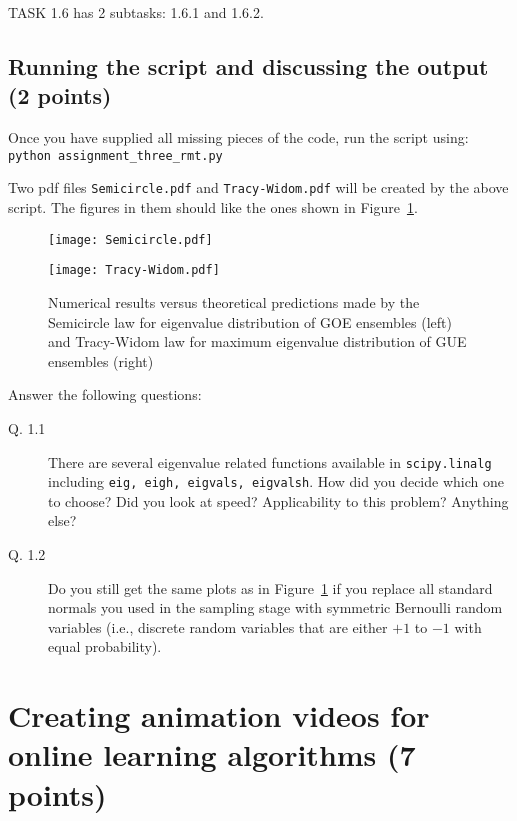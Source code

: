 \documentclass{article}
\begin{document}
TASK 1.6 has 2 subtasks: 1.6.1 and 1.6.2.

\subsection{Running the script and discussing the output (2 points)}

Once you have supplied all missing pieces of the code, run the script using:\\
{\tt python assignment\_three\_rmt.py}

Two pdf files \verb#Semicircle.pdf# and \verb#Tracy-Widom.pdf# will be created by the above script. The figures in them should like the ones
shown in Figure~\ref{rmt}.

\begin{figure}
\begin{minipage}{.4\textwidth}
\texttt{[image: Semicircle.pdf]}
\end{minipage}
\hspace{.1\textwidth}
\begin{minipage}{.4\textwidth}
\texttt{[image: Tracy-Widom.pdf]}
\end{minipage}
\caption{Numerical results versus theoretical predictions made by the Semicircle law for eigenvalue distribution of GOE ensembles (left) and Tracy-Widom law for
maximum eigenvalue distribution of GUE ensembles (right)}
\label{rmt}
\end{figure}

Answer the following questions:
\begin{description}
\item[Q. 1.1]
There are several eigenvalue related functions available in \verb#scipy.linalg# including {\tt eig, eigh, eigvals, eigvalsh}. How did you decide which one to choose?
Did you look at speed? Applicability to this problem? Anything else?
\item[Q. 1.2]
Do you still get the same plots as in Figure~\ref{rmt} if you replace all standard normals you used in the sampling stage with symmetric Bernoulli random variables (i.e.,
discrete random variables that are either $+1$ to $-1$ with equal probability).

\end{description}

\section{Creating animation videos for online learning algorithms (7 points)}
\end{document}
